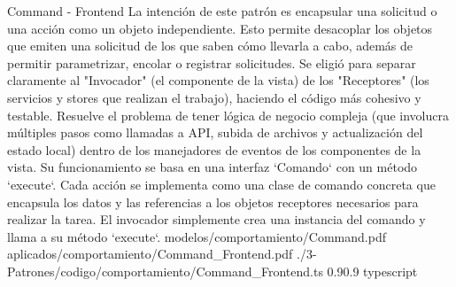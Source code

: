 \Patron
    {Command - Frontend}
    {La intención de este patrón es encapsular una solicitud o una acción como un objeto independiente. Esto permite desacoplar los objetos que emiten una solicitud de los que saben cómo llevarla a cabo, además de permitir parametrizar, encolar o registrar solicitudes. Se eligió para separar claramente al "Invocador" (el componente de la vista) de los "Receptores" (los servicios y stores que realizan el trabajo), haciendo el código más cohesivo y testable.}
    {Resuelve el problema de tener lógica de negocio compleja (que involucra múltiples pasos como llamadas a API, subida de archivos y actualización del estado local) dentro de los manejadores de eventos de los componentes de la vista. Su funcionamiento se basa en una interfaz `Comando` con un método `execute`. Cada acción se implementa como una clase de comando concreta que encapsula los datos y las referencias a los objetos receptores necesarios para realizar la tarea. El invocador simplemente crea una instancia del comando y llama a su método `execute`.}
    {modelos/comportamiento/Command.pdf}
    {aplicados/comportamiento/Command_Frontend.pdf}
    {./3-Patrones/codigo/comportamiento/Command_Frontend.ts}
    {0.9}{0.9}
    {typescript}
\newpage


